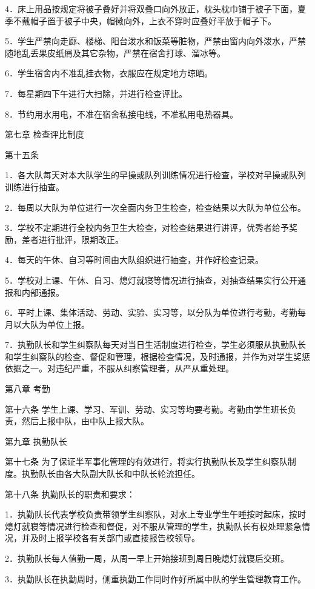 \documentclass[UTF8,12pt,a4paper]{report}
\begin{document}
4．床上用品按规定将被子叠好并将双叠口向外放正，枕头枕巾铺于被子下面，夏季不戴帽子置于被子中央，帽徽向外，上衣不穿时应叠好平放于帽子下。

5．学生严禁向走廊、楼梯、阳台泼水和饭菜等脏物，严禁由窗内向外泼水，严禁随地乱丢果皮纸屑及其它杂物，严禁在宿舍打球、溜冰等。

6．学生宿舍内不准乱挂衣物，衣服应在规定地方晾晒。

7．每星期四下午进行大扫除，并进行检查评比。

8．节约用水用电，不准在宿舍私接电线，不准私用电热器具。

第七章 检查评比制度

第十五条

1．各大队每天对本大队学生的早操或队列训练情况进行检查，学校对早操或队列训练进行抽查。

2．每周以大队为单位进行一次全面内务卫生检查，检查结果以大队为单位公布。

3．学校不定期进行全校内务卫生大检查，对检查结果进行讲评，优秀者给予奖励，差者进行批评，限期改正。

4．每天的午休、自习等时间由大队组织进行抽查，并作好检查记录。

5．学校对上课、午休、自习、熄灯就寝等情况进行抽查，对抽查结果实行公开通报和内部通报。

6．平时上课、集体活动、劳动、实验、实习等，以分队为单位进行考勤，考勤每月以大队为单位上报。

7．执勤队长和学生纠察队每天对当日生活制度进行检查，学生必须服从执勤队长和学生纠察队的检查、督促和管理，根据检查情况，及时通报，并作为对学生奖惩依据之一。对违纪严重，不服从纠察管理者，从严从重处理。

第八章 考勤

第十六条 学生上课、学习、军训、劳动、实习等均要考勤。考勤由学生班长负责，然后上报中队，由中队上报大队。

第九章 执勤队长

第十七条 为了保证半军事化管理的有效进行，将实行执勤队长及学生纠察队制度。执勤队长由各大队副大队长和中队长轮流担任。

第十八条 执勤队长的职责和要求：

1．执勤队长代表学校负责带领学生纠察队，对水上专业学生午睡按时起床，按时熄灯就寝等情况进行检查和督促，对不服从管理的学生，执勤队长有权处理紧急情况，并及时上报学校各有关部门或直接报告校领导。

2．执勤队长每人值勤一周，从周一早上开始接班到周日晚熄灯就寝后交班。

3．执勤队长在执勤周时，侧重执勤工作同时作好所属中队的学生管理教育工作。
\end{document}
